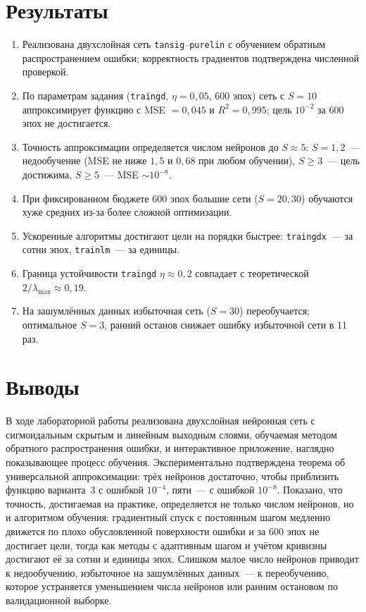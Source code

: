 \documentclass[14pt,a4paper]{extarticle}
\begin{document}
\section{Результаты}

\begin{enumerate}
\item Реализована двухслойная сеть \texttt{tansig}--\texttt{purelin} с обучением обратным распространением ошибки; корректность градиентов подтверждена численной проверкой.
\item По параметрам задания (\texttt{traingd}, $\eta = 0{,}05$, 600 эпох) сеть с $S = 10$ аппроксимирует функцию с MSE $= 0{,}045$ и $R^2 = 0{,}995$; цель $10^{-2}$ за 600 эпох не достигается.
\item Точность аппроксимации определяется числом нейронов до $S \approx 5$: $S = 1, 2$~--- недообучение (MSE не ниже $1{,}5$ и $0{,}68$ при любом обучении), $S \ge 3$~--- цель достижима, $S \ge 5$~--- MSE $\sim 10^{-8}$.
\item При фиксированном бюджете 600 эпох большие сети ($S = 20, 30$) обучаются хуже средних из-за более сложной оптимизации.
\item Ускоренные алгоритмы достигают цели на порядки быстрее: \texttt{traingdx}~--- за сотни эпох, \texttt{trainlm}~--- за единицы.
\item Граница устойчивости \texttt{traingd} $\eta \approx 0{,}2$ совпадает с теоретической $2/\lambda_{\max} \approx 0{,}19$.
\item На зашумлённых данных избыточная сеть ($S = 30$) переобучается; оптимальное $S = 3$, ранний останов снижает ошибку избыточной сети в 11 раз.
\end{enumerate}



\section{Выводы}

В ходе лабораторной работы реализована двухслойная нейронная сеть с сигмоидальным скрытым и линейным выходным слоями, обучаемая методом обратного распространения ошибки, и интерактивное приложение, наглядно показывающее процесс обучения. Экспериментально подтверждена теорема об универсальной аппроксимации: трёх нейронов достаточно, чтобы приблизить функцию варианта~3 с ошибкой $10^{-4}$, пяти~--- с ошибкой $10^{-8}$. Показано, что точность, достигаемая на практике, определяется не только числом нейронов, но и алгоритмом обучения: градиентный спуск с постоянным шагом медленно движется по плохо обусловленной поверхности ошибки и за 600 эпох не достигает цели, тогда как методы с адаптивным шагом и учётом кривизны достигают её за сотни и единицы эпох. Слишком малое число нейронов приводит к недообучению, избыточное на зашумлённых данных~--- к переобучению, которое устраняется уменьшением числа нейронов или ранним остановом по валидационной выборке.
\end{document}
